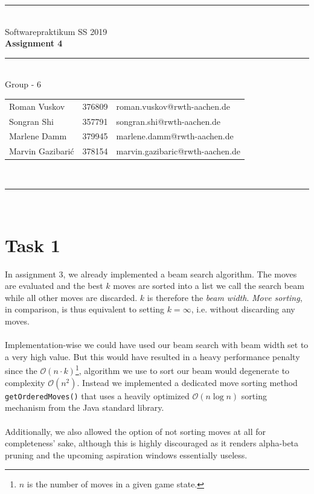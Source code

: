 \documentclass[a4paper,12pt]{article}
\begin{document}
\begin{center}
	\rule{\textwidth}{0.1pt}\\[1cm]
	
	\Large Softwarepraktikum SS 2019\\\bf Assignment 4
\end{center}


\begin{center}

	\rule{\textwidth}{0.1pt}\\[0.5cm]

	{\Large Group - 6\\[5mm]}

	\begin{tabular}{lll}

		Roman Vuskov & 376809 & roman.vuskov@rwth-aachen.de \\

		Songran Shi & 357791 & songran.shi@rwth-aachen.de \\

		Marlene Damm & 379945 & marlene.damm@rwth-aachen.de \\
		
		Marvin Gazibarić & 378154 & marvin.gazibaric@rwth-aachen.de \\

	\end{tabular}\\[0.5cm]

	\rule{\textwidth}{0.1pt}\\[1cm]

\end{center}

\newpage

\section{Task 1}

In assignment 3, we already implemented a beam search algorithm. The moves are evaluated and the best $k$ moves are sorted into a list we call the search beam while all other moves are discarded. $k$ is therefore the \emph{beam width}. \emph{Move sorting}, in comparison, is thus equivalent to setting $k=\infty$, i.e. without discarding any moves.
\\ \\
Implementation-wise we could have used our beam search with beam width set to a very high value. But this would have resulted in a heavy performance penalty since the $\mathcal O(n\cdot k)$\footnote{$n$ is the number of moves in a given game state.}, 
algorithm we use to sort our beam would degenerate to complexity $\mathcal O(n^2)$. Instead we implemented a dedicated move sorting method \texttt{getOrderedMoves()} that uses a heavily optimized $\mathcal O(n\log n)$ sorting mechanism from the Java standard library.
\\ \\
Additionally, we also allowed the option of not sorting moves at all for completeness' sake, although this is highly discouraged as it renders alpha-beta pruning and the upcoming aspiration windows essentially useless.
\end{document}

